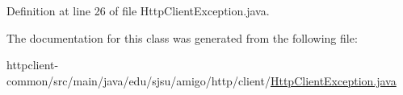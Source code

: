 Definition at line 26 of file Http\+Client\+Exception.\+java.



The documentation for this class was generated from the following file\+:\begin{DoxyCompactItemize}
\item 
httpclient-\/common/src/main/java/edu/sjsu/amigo/http/client/\hyperlink{_http_client_exception_8java}{Http\+Client\+Exception.\+java}\end{DoxyCompactItemize}
